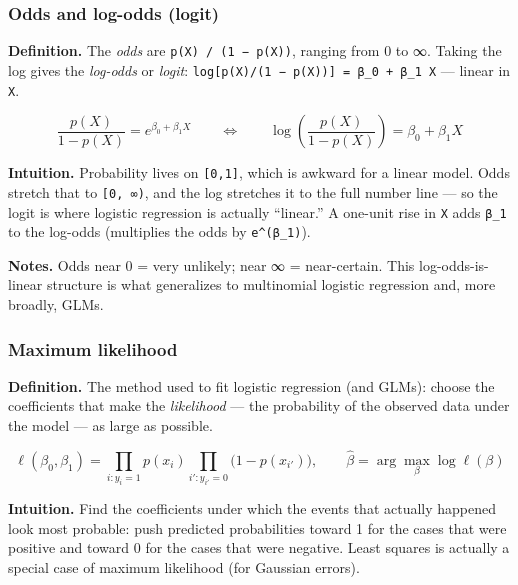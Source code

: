 \documentclass[
  10pt,
  letterpaper,
  onecolumn]{article}
\begin{document}
\hypertarget{odds-and-log-odds-logit}{%
\subsubsection{Odds and log-odds
(logit)}\label{odds-and-log-odds-logit}}

\textbf{Definition.} The \emph{odds} are \texttt{p(X)\ /\ (1\ −\ p(X))},
ranging from 0 to ∞. Taking the log gives the \emph{log-odds} or
\emph{logit}: \texttt{log{[}p(X)/(1\ −\ p(X)){]}\ =\ β\_0\ +\ β\_1\ X}
--- linear in \texttt{X}.

\begin{equation*}
\frac{p(X)}{1-p(X)}=e^{\beta_0+\beta_1X}
\qquad\Longleftrightarrow\qquad
\log\!\left(\frac{p(X)}{1-p(X)}\right)=\beta_0+\beta_1X
\end{equation*}

\textbf{Intuition.} Probability lives on \texttt{{[}0,1{]}}, which is
awkward for a linear model. Odds stretch that to \texttt{{[}0,\ ∞)}, and
the log stretches it to the full number line --- so the logit is where
logistic regression is actually ``linear.'' A one-unit rise in
\texttt{X} adds \texttt{β\_1} to the log-odds (multiplies the odds by
\texttt{e\^{}(β\_1)}).

\textbf{Notes.} Odds near 0 = very unlikely; near ∞ = near-certain. This
log-odds-is-linear structure is what generalizes to multinomial logistic
regression and, more broadly, GLMs.

\hypertarget{maximum-likelihood}{%
\subsubsection{Maximum likelihood}\label{maximum-likelihood}}

\textbf{Definition.} The method used to fit logistic regression (and
GLMs): choose the coefficients that make the \emph{likelihood} --- the
probability of the observed data under the model --- as large as
possible.

\begin{equation*}
\ell(\beta_0,\beta_1)=\prod_{i:y_i=1}p(x_i)\prod_{i':y_{i'}=0}\bigl(1-p(x_{i'})\bigr),
\qquad
\hat\beta=\arg\max_\beta \log \ell(\beta)
\end{equation*}

\textbf{Intuition.} Find the coefficients under which the events that
actually happened look most probable: push predicted probabilities
toward 1 for the cases that were positive and toward 0 for the cases
that were negative. Least squares is actually a special case of maximum
likelihood (for Gaussian errors).
\end{document}
